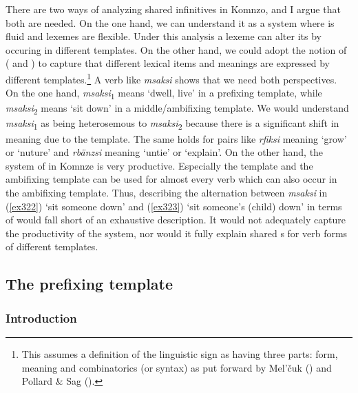 There are two ways of analyzing shared infinitives in Komnzo, and I argue that both are needed. On the one hand, we can understand it as a system where  is fluid and lexemes are flexible. Under this analysis a lexeme can alter its  by occuring in different templates. On the other hand, we could adopt the notion of  (\citealt{Lichtenberk:1991ic} and \citealt[524]{Evans:2012we}) to capture that different lexical items and meanings are expressed by different templates.\footnote{This assumes a definition of the linguistic sign as having three parts: form, meaning and combinatorics (or syntax) as put forward by Mel'{\v c}uk (\citeyear{Melcuk:1973vu}) and Pollard \& Sag (\citeyear[51]{Pollard:1987wu}).} A verb like \emph{msaksi} shows that we need both perspectives. On the one hand, \emph{msaksi}\textsubscript{1} means `dwell, live' in a prefixing template, while \emph{msaksi}\textsubscript{2} means `sit down' in a middle/ambifixing template. We would understand \emph{msaksi}\textsubscript{1} as being heterosemous to \emph{msaksi}\textsubscript{2} because there is a significant shift in meaning due to the template. The same holds for pairs like \emph{rfiksi} meaning `grow' or `nuture' and \emph{rbänzsi} meaning `untie' or `explain'. On the other hand, the system of  in Komnze is very productive. Especially the  template and the  ambifixing template can be used for almost every verb which can also occur in the  ambifixing template. Thus, describing the alternation between \emph{msaksi} in (\ref{ex322}) `sit someone down' and (\ref{ex323}) `sit someone's (child) down' in terms of  would fall short of an exhaustive description. It would not adequately capture the productivity of the system, nor would it fully explain shared s for verb forms of different templates.

\subsection{The prefixing template} \label{prefixingverbsec}
\largerpage[2]
\subsubsection{Introduction}

